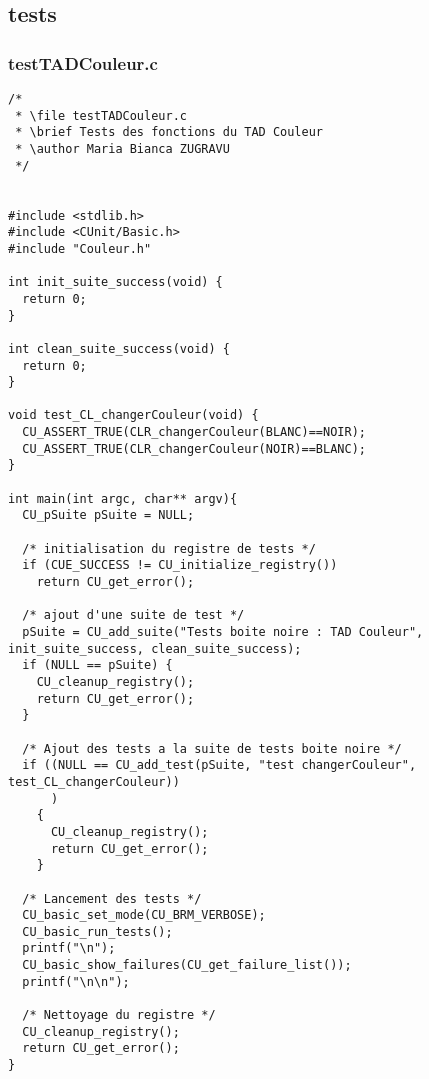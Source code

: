 \subsection{tests}

\subsubsection{testTADCouleur.c}
\begin{lstlisting}
/*
 * \file testTADCouleur.c
 * \brief Tests des fonctions du TAD Couleur
 * \author Maria Bianca ZUGRAVU
 */


#include <stdlib.h>
#include <CUnit/Basic.h>
#include "Couleur.h"

int init_suite_success(void) {
  return 0;
}

int clean_suite_success(void) {
  return 0;
}

void test_CL_changerCouleur(void) {
  CU_ASSERT_TRUE(CLR_changerCouleur(BLANC)==NOIR);
  CU_ASSERT_TRUE(CLR_changerCouleur(NOIR)==BLANC);
}

int main(int argc, char** argv){
  CU_pSuite pSuite = NULL;

  /* initialisation du registre de tests */
  if (CUE_SUCCESS != CU_initialize_registry())
    return CU_get_error();

  /* ajout d'une suite de test */
  pSuite = CU_add_suite("Tests boite noire : TAD Couleur", init_suite_success, clean_suite_success);
  if (NULL == pSuite) {
    CU_cleanup_registry();
    return CU_get_error();
  }

  /* Ajout des tests a la suite de tests boite noire */
  if ((NULL == CU_add_test(pSuite, "test changerCouleur", test_CL_changerCouleur))
      )
    {
      CU_cleanup_registry();
      return CU_get_error();
    }

  /* Lancement des tests */
  CU_basic_set_mode(CU_BRM_VERBOSE);
  CU_basic_run_tests();
  printf("\n");
  CU_basic_show_failures(CU_get_failure_list());
  printf("\n\n");

  /* Nettoyage du registre */
  CU_cleanup_registry();
  return CU_get_error();
}  
\end{lstlisting}

